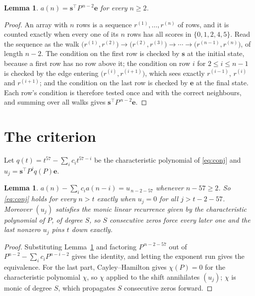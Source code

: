 \documentclass[11pt,a4paper]{article}
\theoremstyle{plain}
\newtheorem{lemma}[theorem]{Lemma}
\theoremstyle{definition}
\begin{document}
\begin{lemma}\label{lem:walk}
$a(n)=\mathbf{s}^{\!\top}P^{\,n-2}\mathbf{e}$ for every $n\ge2$.
\end{lemma}

\begin{proof}
An array with $n$ rows is a sequence $r^{(1)},\dots,r^{(n)}$ of rows, and it is counted
exactly when every one of its $n$ rows has all scores in $\{0,1,2,4,5\}$. Read the sequence as the
walk $\bigl(r^{(1)},r^{(2)}\bigr)\to\bigl(r^{(2)},r^{(3)}\bigr)\to\cdots\to
\bigl(r^{(n-1)},r^{(n)}\bigr)$, of length $n-2$. The condition on the first row is
checked by $\mathbf{s}$ at the initial state, because a first row has no row above it; the
condition on row $i$ for $2\le i\le n-1$ is checked by the edge entering
$\bigl(r^{(i)},r^{(i+1)}\bigr)$, which sees exactly $r^{(i-1)}$, $r^{(i)}$ and
$r^{(i+1)}$; and the condition on the last row is checked by $\mathbf{e}$ at the final
state. Each row's condition is therefore tested once and with the correct neighbours, and
summing over all walks gives $\mathbf{s}^{\!\top}P^{\,n-2}\mathbf{e}$.
\end{proof}

\section{The criterion}

Let $q(t)=t^{57}-\sum_i c_i t^{57-i}$ be the characteristic polynomial of
\eqref{eq:conj} and $u_j=\mathbf{s}^{\!\top}P^{j}q(P)\mathbf{e}$.

\begin{lemma}\label{lem:crit}
$a(n)-\sum_i c_i a(n-i)=u_{\,n-2-57}$ whenever $n-57\ge2$. So \eqref{eq:conj}
holds for every $n>t$ exactly when $u_j=0$ for all $j>t-2-57$. Moreover $(u_j)$
satisfies the monic linear recurrence given by the characteristic polynomial of $P$, of
degree $S$, so $S$ consecutive zeros force every later one and the last nonzero $u_j$ pins
$t$ down exactly.
\end{lemma}

\begin{proof}
Substituting Lemma~\ref{lem:walk} and factoring $P^{\,n-2-57}$ out of
$P^{n-2}-\sum_i c_i P^{n-i-2}$ gives the identity, and letting the exponent run gives the
equivalence. For the last part, Cayley--Hamilton gives $\chi(P)=0$ for the characteristic
polynomial $\chi$, so $\chi$ applied to the shift annihilates $(u_j)$; $\chi$ is monic of
degree $S$, which propagates $S$ consecutive zeros forward.
\end{proof}
\end{document}
